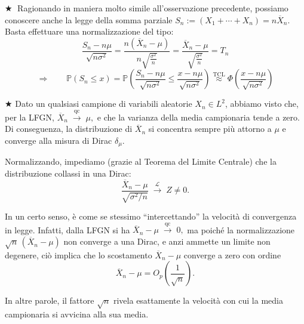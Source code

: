 \bigskip
\noindent \(\bigstar \;\) Ragionando in maniera molto simile all'osservazione precedente, possiamo conoscere anche la legge della somma parziale $S_n := (X_1+\cdots+X_n) = n \overline{X}_n$. Basta effettuare una normalizzazione del tipo:
\[\frac{S_n  - n\mu}{\sqrt{n\sigma^2}} = \frac{n(\overline{X}_n -\mu)}{n\sqrt{\frac{\sigma^2}{n}}} = \frac{\overline{X}_n  - \mu}{\sqrt{\frac{\sigma^2}n}} = T_n\]
\[\Rightarrow \qquad \mathbb{P}(S_n\leq x) = \mathbb{P}\left(\frac{S_n  - n\mu}{\sqrt{n\sigma^2}}\leq \frac{x  - n\mu}{\sqrt{n\sigma^2}}\right)\overset{\text{TCL}}{\approx} \Phi\left(\frac{x - n\mu}{\sqrt{n\sigma^2}}\right)\] 

\bigskip
\noindent $\bigstar$\; Dato un qualsiasi campione di variabili aleatorie $X_n\in L^2$, abbiamo visto che, per la LFGN, $\overline{X}_n \;\overset{\mathrm{qc}}{\longrightarrow}\; \mu,$ e che la varianza della media campionaria tende a zero. Di conseguenza, la distribuzione di $\overline{X}_n$ si concentra sempre più attorno a $\mu$ e converge alla misura di Dirac $\delta_\mu$.

\medskip
\noindent Normalizzando, impediamo (grazie al Teorema del Limite Centrale) che la distribuzione collassi in una Dirac:
\[
\frac{\overline{X}_n - \mu}{\sqrt{\sigma^{2}/n}}
\;\overset{\mathcal{L}}{\longrightarrow}\; Z \neq 0.
\]

\medskip
\noindent In un certo senso, è come se stessimo ``intercettando'' la velocità di convergenza in legge. Infatti, dalla LFGN si ha $\overline{X}_n - \mu \;\overset{\mathrm{qc}}{\longrightarrow}\; 0,$ ma poiché la normalizzazione \(\sqrt{n}\,(\overline{X}_n - \mu)\) non converge a una Dirac, e anzi ammette un limite non degenere, ciò implica che lo scostamento $\overline{X}_n - \mu$ converge a zero con ordine
\[
\overline{X}_n - \mu = O_p\!\left(\frac{1}{\sqrt{n}}\right).
\]

In altre parole, il fattore $\sqrt{n}$ rivela esattamente la velocità con cui la media campionaria si avvicina alla sua media.

